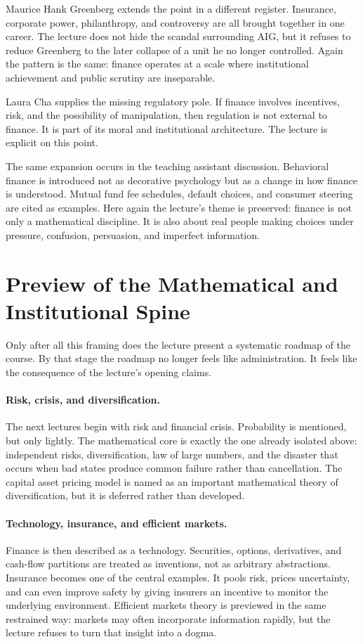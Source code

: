 Maurice Hank Greenberg extends the point in a different register. Insurance, corporate power, philanthropy, and controversy are all brought together in one career. The lecture does not hide the scandal surrounding AIG, but it refuses to reduce Greenberg to the later collapse of a unit he no longer controlled. Again the pattern is the same: finance operates at a scale where institutional achievement and public scrutiny are inseparable.

Laura Cha supplies the missing regulatory pole. If finance involves incentives, risk, and the possibility of manipulation, then regulation is not external to finance. It is part of its moral and institutional architecture. The lecture is explicit on this point.

The same expansion occurs in the teaching assistant discussion. Behavioral finance is introduced not as decorative psychology but as a change in how finance is understood. Mutual fund fee schedules, default choices, and consumer steering are cited as examples. Here again the lecture's theme is preserved: finance is not only a mathematical discipline. It is also about real people making choices under pressure, confusion, persuasion, and imperfect information.

\section{Preview of the Mathematical and Institutional Spine}

Only after all this framing does the lecture present a systematic roadmap of the course. By that stage the roadmap no longer feels like administration. It feels like the consequence of the lecture's opening claims.

\paragraph{Risk, crisis, and diversification.}
The next lectures begin with risk and financial crisis. Probability is mentioned, but only lightly. The mathematical core is exactly the one already isolated above: independent risks, diversification, law of large numbers, and the disaster that occurs when bad states produce common failure rather than cancellation. The capital asset pricing model is named as an important mathematical theory of diversification, but it is deferred rather than developed.

\paragraph{Technology, insurance, and efficient markets.}
Finance is then described as a technology. Securities, options, derivatives, and cash-flow partitions are treated as inventions, not as arbitrary abstractions. Insurance becomes one of the central examples. It pools risk, prices uncertainty, and can even improve safety by giving insurers an incentive to monitor the underlying environment. Efficient markets theory is previewed in the same restrained way: markets may often incorporate information rapidly, but the lecture refuses to turn that insight into a dogma.

